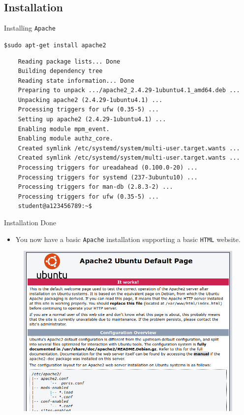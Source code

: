 \documentclass[xcolor=table]{beamer}
\begin{document}
\subsection{Installation}
\begin{frame}[fragile]{Installing \texttt{Apache}}
  \begin{tcolorbox}
    \begin{center}
      \scriptsize \texttt{\$sudo apt-get install apache2}
    \end{center}
  \end{tcolorbox}
  \begin{tcolorbox}
    \lstset{
      basicstyle=\tiny\ttfamily,
    }
    \begin{lstlisting}
    Reading package lists... Done
    Building dependency tree
    Reading state information... Done
    Preparing to unpack .../apache2_2.4.29-1ubuntu4.1_amd64.deb ...
    Unpacking apache2 (2.4.29-1ubuntu4.1) ...
    Processing triggers for ufw (0.35-5) ...
    Setting up apache2 (2.4.29-1ubuntu4.1) ...
    Enabling module mpm_event.
    Enabling module authz_core.
    Created symlink /etc/systemd/system/multi-user.target.wants ...
    Created symlink /etc/systemd/system/multi-user.target.wants ...
    Processing triggers for ureadahead (0.100.0-20) ...
    Processing triggers for systemd (237-3ubuntu10) ...
    Processing triggers for man-db (2.8.3-2) ...
    Processing triggers for ufw (0.35-5) ...
    student@a123456789:~$
    \end{lstlisting}
  \end{tcolorbox}
\end{frame}

\begin{frame}{Installation Done}
  \begin{itemize}
    \item You now have a basic \texttt{Apache} installation supporting a basic \texttt{HTML} website.
  \end{itemize}
  \begin{figure}
    \begin{center}
      \includegraphics[width=0.6\linewidth]{IntroPage.png}
    \end{center}
  \end{figure}
\end{frame}
\end{document}
